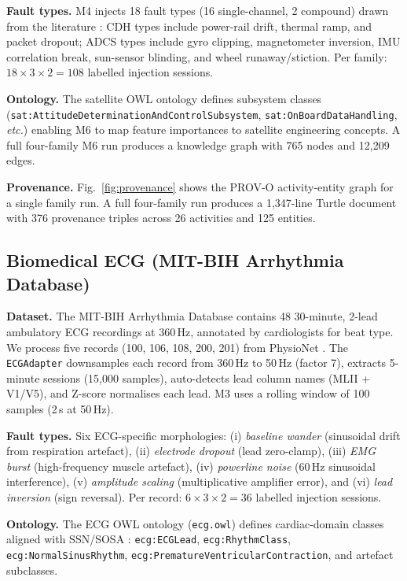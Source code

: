 \documentclass[conference]{IEEEtran}
\begin{document}
\textbf{Fault types.} M4 injects 18 fault types (16 single-channel, 2 compound)
drawn from the literature \cite{hundman2018detecting,lavin2015nab,wu2022benchmarks}:
CDH types include power-rail drift, thermal ramp, and packet dropout; ADCS types
include gyro clipping, magnetometer inversion, IMU correlation break, sun-sensor
blinding, and wheel runaway/stiction. Per family: $18 \times 3 \times 2 = 108$
labelled injection sessions.

\textbf{Ontology.} The satellite OWL ontology defines subsystem classes
(\texttt{sat:AttitudeDeterminationAndControlSubsystem},
\texttt{sat:OnBoardDataHandling}, \emph{etc.}) enabling M6 to map feature
importances to satellite engineering concepts. A full four-family M6 run produces
a knowledge graph with 765 nodes and 12,209 edges.

\textbf{Provenance.} Fig.~\ref{fig:provenance} shows the PROV-O activity-entity
graph for a single family run. A full four-family run produces a 1,347-line Turtle
document with 376 provenance triples across 26 activities and 125 entities.

\subsection{Biomedical ECG (MIT-BIH Arrhythmia Database)}

\textbf{Dataset.} The MIT-BIH Arrhythmia Database \cite{moody2001mitbih} contains
48 30-minute, 2-lead ambulatory ECG recordings at 360\,Hz, annotated by
cardiologists for beat type. We process five records (100, 106, 108, 200, 201)
from PhysioNet \cite{goldberger2000physiobank}. The \texttt{ECGAdapter} downsamples
each record from 360\,Hz to 50\,Hz (factor 7), extracts 5-minute sessions
(15,000 samples), auto-detects lead column names (MLII + V1/V5), and Z-score
normalises each lead. M3 uses a rolling window of 100 samples (2\,s at 50\,Hz).

\textbf{Fault types.} Six ECG-specific morphologies: (i) \emph{baseline wander}
(sinusoidal drift from respiration artefact), (ii) \emph{electrode dropout}
(lead zero-clamp), (iii) \emph{EMG burst} (high-frequency muscle artefact),
(iv) \emph{powerline noise} (60\,Hz sinusoidal interference), (v) \emph{amplitude
scaling} (multiplicative amplifier error), and (vi) \emph{lead inversion} (sign
reversal). Per record: $6 \times 3 \times 2 = 36$ labelled injection sessions.

\textbf{Ontology.} The ECG OWL ontology (\texttt{ecg.owl}) defines cardiac-domain
classes aligned with SSN/SOSA \cite{compton2012ssn}: \texttt{ecg:ECGLead},
\texttt{ecg:RhythmClass}, \texttt{ecg:NormalSinusRhythm},
\texttt{ecg:PrematureVentricularContraction}, and artefact subclasses.
\end{document}

